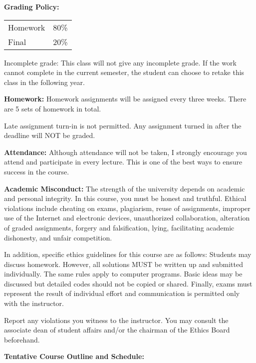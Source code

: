 \documentclass[a4paper,10pt]{article}
\begin{document}
\textbf{Grading Policy:}

\begin{tabular}{lr}
Homework & 80\%\\
Final          & 20\% 
\end{tabular}


Incomplete grade: This class will not give any
incomplete grade. If the work cannot complete in the
current semester, the student can choose to retake this
class in the following year.






\textbf{Homework:} Homework assignments will be assigned every three weeks. There are 5 sets of homework in total. 

Late assignment turn-in is not permitted. Any assignment turned in after the deadline will NOT be graded.




\textbf{Attendance:} Although attendance will not be taken, I strongly encourage you attend and participate in every lecture. This is one of the best ways to ensure success in the course.






\textbf{Academic Misconduct:} The strength of the university depends on academic and personal integrity. In this course, you must be honest 
and truthful. Ethical violations include cheating on exams, plagiarism, reuse of assignments, improper use 
of the Internet and electronic devices, unauthorized collaboration, alteration of graded assignments, forgery 
and falsification, lying, facilitating academic dishonesty, and unfair competition.

In addition, specific ethics guidelines for this course are as follows: Students may discuss homework. However, 
all solutions MUST be written up and submitted individually. The same rules apply to computer programs. 
Basic ideas may be discussed but detailed codes should not be copied or shared. Finally, exams must 
represent the result of individual effort and communication is permitted only with the instructor.

Report any violations you witness to the instructor. You may consult the associate dean of student affairs 
and/or the chairman of the Ethics Board beforehand. 

\textbf{Tentative Course Outline and Schedule:}
\end{document}
